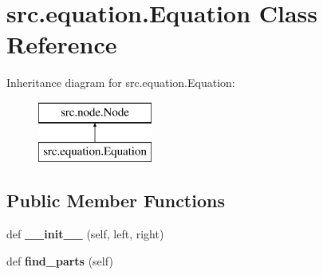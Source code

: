 \hypertarget{classsrc_1_1equation_1_1Equation}{}\section{src.\+equation.\+Equation Class Reference}
\label{classsrc_1_1equation_1_1Equation}
Inheritance diagram for src.\+equation.\+Equation\+:\begin{figure}[H]
\begin{center}
\leavevmode
\includegraphics[height=2.000000cm]{classsrc_1_1equation_1_1Equation}
\end{center}
\end{figure}
\subsection*{Public Member Functions}
\begin{DoxyCompactItemize}
\item 
\mbox{\label{classsrc_1_1equation_1_1Equation_a4bf4ab4548bc637d3c47c88f41c67ba2}} 
def {\bfseries \+\_\+\+\_\+init\+\_\+\+\_\+} (self, left, right)
\item 
\mbox{\label{classsrc_1_1equation_1_1Equation_a689f6c4e232d60aa2fba44b46f46dcc3}} 
def {\bfseries find\+\_\+parts} (self)
\end{DoxyCompactItemize}
